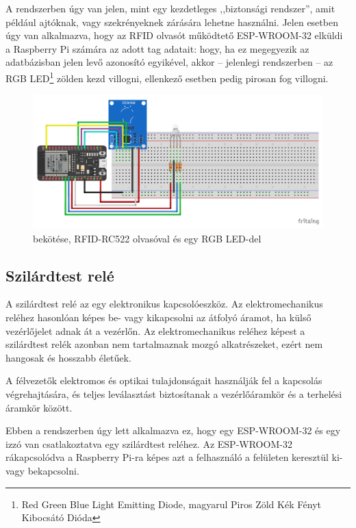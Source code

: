 \documentclass[
]{thesis-ekf}
\theoremstyle{definition}
\theoremstyle{remark}
\begin{document}
	A rendszerben úgy van jelen, mint egy kezdetleges ,,biztonsági rendszer'', amit például ajtóknak, vagy szekrényeknek zárására lehetne használni. Jelen esetben úgy van alkalmazva, hogy az RFID olvasót működtető ESP-WROOM-32 elküldi a Raspberry Pi számára az adott tag adatait: hogy, ha ez megegyezik az adatbázisban jelen levő azonosító egyikével, akkor -- jelenlegi rendszerben -- az RGB LED\footnote{\label{rgb-led}Red Green Blue Light Emitting Diode, magyarul Piros Zöld Kék Fényt Kibocsátó Dióda} zölden kezd villogni, ellenkező esetben pedig pirosan fog villogni.
	
	\begin{figure}[ht!]
		\centering
		\includegraphics[width=16cm]{./img/RFID reader schematics_bb}
		\caption{ bekötése, RFID-RC522 olvasóval és egy RGB LED-del}
		\label{rfid-schematics}
	\end{figure}	
	
	\subsection{Szilárdtest relé}
	
	A szilárdtest relé az egy elektronikus kapcsolóeszköz. Az elektromechanikus reléhez hasonlóan képes be- vagy kikapcsolni az átfolyó áramot, ha külső vezérlőjelet adnak át a vezérlőn. Az elektromechanikus reléhez képest a szilárdtest relék azonban nem tartalmaznak mozgó alkatrészeket, ezért nem hangosak és hosszabb életűek. 
	
	A félvezetők elektromos és optikai tulajdonságait használják fel a kapcsolás végrehajtására, és teljes leválasztást biztosítanak a vezérlőáramkör és a terhelési áramkör között.\cite{solid-state-relay}
	
	Ebben a rendszerben úgy lett alkalmazva ez, hogy egy ESP-WROOM-32 és egy izzó van csatlakoztatva egy szilárdtest reléhez. Az ESP-WROOM-32 rákapcsolódva a Raspberry Pi-ra képes azt a felhasználó a felületen keresztül ki- vagy bekapcsolni.
	
\end{document}
